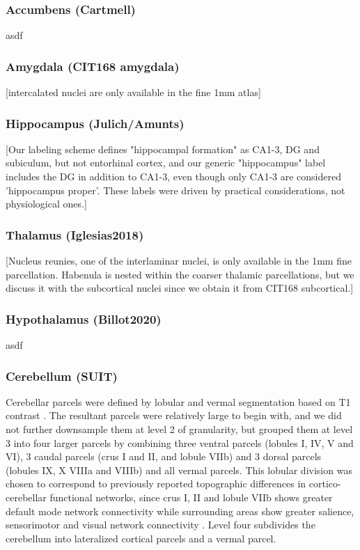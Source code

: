 \documentclass[10pt,letterpaper]{article}
\begin{document}
\subsubsection{Accumbens (Cartmell)} asdf
\\
\subsubsection{Amygdala (CIT168 amygdala)} [intercalated nuclei are only available in the fine 1mm atlas]
\\
\subsubsection{Hippocampus (Julich/Amunts)} [Our labeling scheme defines "hippocampal formation" as CA1-3, DG and subiculum, but not entorhinal cortex, and our generic "hippocampus" label includes the DG in addition to CA1-3, even though only CA1-3 are considered 'hippocampus proper'. These labels were driven by practical considerations, not physiological ones.]
\\
\subsubsection{Thalamus (Iglesias2018)} [Nucleus reunies, one of the interlaminar nuclei, is only available in the 1mm fine parcellation. Habenula is nested within the coarser thalamic parcellations, but we discuss it with the subcortical nuclei since we obtain it from CIT168 subcortical.]
\\
\subsubsection{Hypothalamus (Billot2020)} asdf
\\
\subsubsection{Cerebellum (SUIT)} Cerebellar parcels were defined by lobular and vermal segmentation based on T1 contrast . The resultant parcels were relatively large to begin with, and we did not further downsample them at level 2 of granularity, but grouped them at level 3 into four larger parcels by combining three ventral parcels (lobules I, IV, V and VI), 3 caudal parcels (crus I and II, and lobule VIIb) and 3 dorsal parcels (lobules IX, X VIIIa and VIIIb) and all vermal parcels. This lobular division was chosen to correspond to previously reported topographic differences in cortico-cerebellar functional networks, since crus I, II and lobule VIIb shows greater default mode network connectivity while surrounding areas show greater salience, sensorimotor and visual network connectivity . Level four subdivides the cerebellum into lateralized cortical parcels and a vermal parcel.
\end{document}
